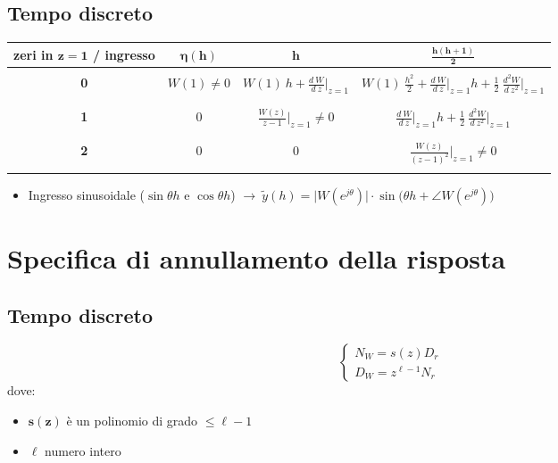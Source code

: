 \documentclass{report}
\theoremstyle{nostyle}
\begin{document}
\subsection*{Tempo discreto}
\begin{center}
\begin{tabular}{c||c|c|c}
    \textbf{zeri in} $\bm{z = 1}$ \textbf{/ ingresso} & $\displaystyle \bm{\eta(h)}  $ & $ \displaystyle  \bm{h}$ & $\displaystyle \bm{\frac{h(h+1)}{2}}  $\\
    \hline
    \hline
    & & & \\
   \textbf{0} & $\displaystyle W(1) \neq 0  $& $\displaystyle  W(1)\ h + \frac{d\ W}{d\ z}\bigg|_{z = 1}$& $\displaystyle  W(1) \ \frac{h^2}{2} +\frac{d \ W}{d\ z}\bigg|_{z = 1} h+ \frac{1}{2} \ \frac{d^2 W}{d\ z^2}\bigg|_{z= 1}   $\\
    & & & \\
    \hline
    & & & \\
   \textbf{1} & 0& $\displaystyle \frac{W(z)}{z-1}\bigg|_{z = 1} \neq 0   $& $\displaystyle \frac{d\ W}{d\ z}\bigg|_{z = 1} h + \frac{1}{2} \ \frac{d^2 W}{d \ z^2}\bigg|_{z=1}   $\\
    & & & \\
    \hline
    & & & \\
   \textbf{2} & 0 & 0 & $\displaystyle \frac{W(z)}{(z-1)^2}\bigg|_{z=1} \neq 0    $\\ 
    & & & \\
     
\end{tabular}

\begin{itemize}
    \item Ingresso sinusoidale ($\sin \theta h$ e $\cos \theta h$) $ \displaystyle  \to \ \tilde{y}(h) = \big|W(e^{j\theta})\big|\cdot \sin \Big(   \theta h + \angle W(e^{j\theta})    \Big)  $
\end{itemize}
\end{center}

\section{Specifica di annullamento della risposta}
\subsection*{Tempo discreto}
\[    \begin{cases}
    N_W = s(z)D_r \\
    D_W = z^ {\ell-1} N_r
\end{cases}     \]
dove:
\begin{itemize}
    \item $\bm{s(z)}$ è un polinomio di grado $\le \ell -1$
    \item $\bm{\ell}$ numero intero
\end{itemize}
\end{document}
